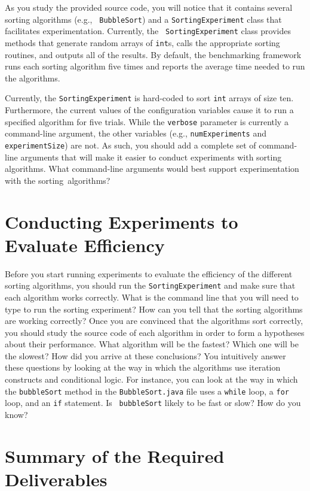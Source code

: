 As you study the provided source code, you will notice that it contains several sorting algorithms (e.g., {\tt
  BubbleSort}) and a {\tt SortingExperiment} class that facilitates experimentation. Currently, the {\tt
  SortingExperiment} class provides methods that generate random arrays of {\tt int}s, calls the appropriate sorting
routines, and outputs all of the results.  By default, the benchmarking framework runs each sorting algorithm five times
and reports the average time needed to run the algorithms.

Currently, the {\tt SortingExperiment} is hard-coded to sort {\tt int} arrays of size ten. Furthermore, the current
values of the configuration variables cause it to run a specified algorithm for five trials.  While the {\tt verbose}
parameter is currently a command-line argument, the other variables (e.g., {\tt numExperiments} and {\tt
  experimentSize}) are not.  As such, you should add a complete set of command-line arguments that will make it easier
to conduct experiments with sorting algorithms. What command-line arguments would best support experimentation with 
the \mbox{sorting algorithms}?

\section*{Conducting Experiments to Evaluate Efficiency}

Before you start running experiments to evaluate the efficiency of the different sorting algorithms, you should run the
{\tt SortingExperiment} and make sure that each algorithm works correctly.  What is the command line that you will need
to type to run the sorting experiment? How can you tell that the sorting algorithms are working correctly? Once you are
convinced that the algorithms sort correctly, you should study the source code of each algorithm in order to form a
hypotheses about their performance.  What algorithm will be the fastest? Which one will be the slowest? How did you
arrive at these conclusions? You intuitively answer these questions by looking at the way in which the algorithms use
iteration constructs and conditional logic. For instance, you can look at the way in which the {\tt bubbleSort} method
in the {\tt BubbleSort.java} file uses a {\tt while} loop, a {\tt for} loop, and an {\tt if} statement. Is {\tt
  bubbleSort} likely to be fast or slow? How do you know?  

\section*{Summary of the Required Deliverables}

